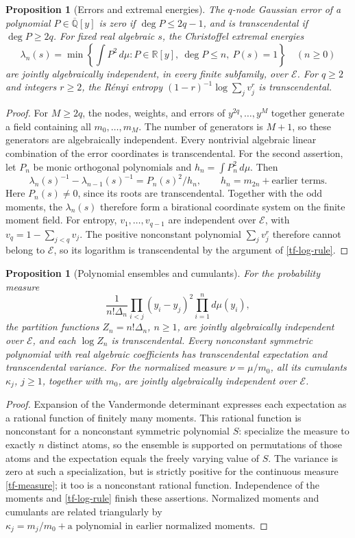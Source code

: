 \documentclass[11pt,a4paper]{article}
\newtheorem{proposition}[theorem]{Proposition}
\theoremstyle{definition}
\theoremstyle{remark}
\numberwithin{equation}{section}
\newcommand{\Qbar}{\overline{\mathbb Q}}
\begin{document}
\begin{proposition}[Errors and extremal energies]\label{tf-errors}
The $q$-node Gaussian error of a polynomial $P\in\Qbar[y]$ is zero if
$\deg P\le2q-1$, and is transcendental if $\deg P\ge2q$.
For fixed real algebraic $s$, the Christoffel extremal energies
\[
 \lambda_n(s)=\min\left\{\int P^2\,d\mu:
             P\in\mathbb R[y],\ \deg P\le n,\ P(s)=1\right\}
 \quad(n\ge0)
\]
are jointly algebraically independent, in every finite subfamily, over
$\mathcal E$.  For $q\ge2$ and integers $r\ge2$, the R\'enyi entropy
$(1-r)^{-1}\log\sum_jv_j^r$ is transcendental.
\end{proposition}
\begin{proof}
For $M\ge2q$, the nodes, weights, and errors of
$y^{2q},\ldots,y^M$ together generate a field containing all
$m_0,\ldots,m_M$.  The number of generators is $M+1$, so these
generators are algebraically independent.  Every nontrivial algebraic
linear combination of the error coordinates is transcendental.
For the second assertion, let $P_n$ be monic orthogonal polynomials and
$h_n=\int P_n^2\,d\mu$.  Then
\[
 \lambda_n(s)^{-1}-\lambda_{n-1}(s)^{-1}
          =P_n(s)^2/h_n,\qquad h_n=m_{2n}+\text{earlier terms}.
\]
Here $P_n(s)\ne0$, since its roots are transcendental.
Together with the odd moments, the $\lambda_n(s)$ therefore form a
birational coordinate system on the finite moment field.
For entropy, $v_1,\ldots,v_{q-1}$ are independent over $\mathcal E$,
with $v_q=1-\sum_{j<q}v_j$.  The positive nonconstant polynomial
$\sum_jv_j^r$ therefore cannot belong to $\mathcal E$, so its logarithm
is transcendental by the argument of \eqref{tf-log-rule}.
\end{proof}

\begin{proposition}[Polynomial ensembles and cumulants]\label{tf-ensembles}
For the probability measure
\[
 \frac1{n!\Delta_n}\prod_{i<j}(y_i-y_j)^2\prod_{i=1}^n d\mu(y_i),
\]
the partition functions $Z_n=n!\Delta_n$, $n\ge1$, are jointly algebraically
independent over $\mathcal E$, and each $\log Z_n$ is transcendental.
Every nonconstant symmetric polynomial with real algebraic coefficients
has transcendental expectation and transcendental variance.
For the normalized measure $\nu=\mu/m_0$, all its cumulants $\kappa_j$,
$j\ge1$, together
with $m_0$, are jointly algebraically independent over $\mathcal E$.
\end{proposition}
\begin{proof}
Expansion of the Vandermonde determinant expresses each expectation as
a rational function of finitely many moments.  This rational function
is nonconstant for a nonconstant symmetric polynomial $S$: specialize
the measure to exactly $n$ distinct atoms, so the ensemble is supported
on permutations of those atoms and the expectation equals the freely
varying value of $S$.  The variance is zero at such a specialization,
but is strictly positive for the continuous measure \eqref{tf-measure};
it too is a nonconstant rational function.  Independence of the moments
and \eqref{tf-log-rule} finish these assertions.
Normalized moments and cumulants are related triangularly by
$\kappa_j=m_j/m_0+\text{a polynomial in earlier normalized moments}$.
\end{proof}
\end{document}
